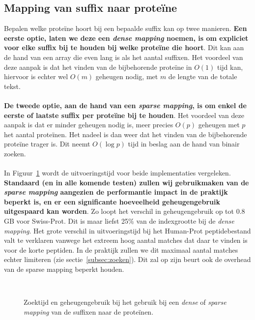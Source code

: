 \subsection{Mapping van suffix naar proteïne}\label{subsec:mapping-van-suffix-naar-proteine}
Bepalen welke proteïne hoort bij een bepaalde suffix kan op twee manieren.
\textbf{Een eerste optie, laten we deze een \textit{dense mapping} noemen, is om expliciet voor elke suffix bij te houden bij welke proteïne die hoort}.
Dit kan aan de hand van een array die even lang is als het aantal suffixen.
Het voordeel van deze aanpak is dat het vinden van de bijbehorende proteïne in $O(1)$ tijd kan, hiervoor is echter wel $O(m)$ geheugen nodig, met $m$ de lengte van de totale tekst.
\\ \\
\textbf{De tweede optie, aan de hand van een \textit{sparse mapping}, is om enkel de eerste of laatste suffix per proteïne bij te houden}.
Het voordeel van deze aanpak is dat er minder geheugen nodig is, meer precies $O(p)$ geheugen met $p$ het aantal proteïnen.
Het nadeel is dan weer dat het vinden van de bijbehorende proteïne trager is.
Dit neemt $O(\log p)$ tijd in beslag aan de hand van binair zoeken.
\\ \\
In Figuur~\ref{fig:dense_vs_sparse} wordt de uitvoeringstijd voor beide implementaties vergeleken.
\textbf{Standaard (en in alle komende testen) zullen wij gebruikmaken van de \textit{sparse mapping} aangezien de performantie impact in de praktijk beperkt is, en er een significante hoeveelheid geheugengebruik uitgespaard kan worden}.
Zo loopt het verschil in geheugengebruik op tot 0.8 GB voor Swiss-Prot.
Dit is maar liefst 25\% van de indexgrootte bij de \textit{dense mapping}.
Het grote verschil in uitvoeringstijd bij het Human-Prot peptidebestand valt te verklaren vanwege het extreem hoog aantal matches dat daar te vinden is voor de korte peptiden.
In de praktijk zullen we dit maximaal aantal matches echter limiteren (zie sectie~\ref{subsec:zoeken}).
Dit zal op zijn beurt ook de overhead van de sparse mapping beperkt houden.
\begin{figure}[H]
    \centering
    \\[4ex] %
    \centering
    \caption{Zoektijd en geheugengebruik bij het gebruik bij een \textit{dense} of \textit{sparse mapping} van de suffixen naar de proteïnen.}\label{fig:dense_vs_sparse}
\end{figure}


